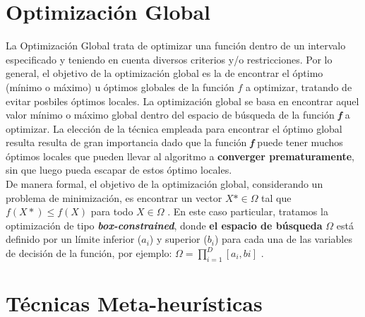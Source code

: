 

\section{Optimización Global}
\label{sec:OPT}


La Optimización Global trata de optimizar una función dentro de un intervalo especificado y teniendo en cuenta diversos criterios y/o restricciones. Por lo general, el objetivo de la optimización global es la de encontrar el óptimo (mínimo o máximo) u óptimos globales de la función $f$ a optimizar, tratando de evitar posbiles óptimos locales. 
La optimización global se basa en encontrar aquel valor mínimo o máximo global dentro del espacio de búsqueda de la función \textbf{\textit{f}} a optimizar. La elección de la técnica empleada para encontrar el óptimo global resulta resulta de gran importancia dado que la función \textbf{\textit{f}} puede tener muchos óptimos locales que pueden llevar al algoritmo a \textbf{converger prematuramente}, sin que luego pueda escapar de estos óptimo locales. \\
De manera formal, el objetivo de la optimización global, considerando un problema de minimización, es encontrar un vector $X* \in \Omega$ tal que $f(X*) \leq f(X)$ para todo $X \in \Omega$ \cite{Segredo2017}.
En este caso particular, tratamos la optimización de tipo \textbf{\textit{box-constrained}}, donde \textbf{el espacio de búsqueda} $\Omega$ está definido por un límite inferior ($a_{i}$) y superior ($b_{i}$) para cada una de las variables de decisión de la función, por ejemplo: $\Omega = \prod^{D}_{i=1}[a_{i}, b{i}]$ \cite{Segredo2017}.


\section{Técnicas Meta-heurísticas}
\label{sec:META}

